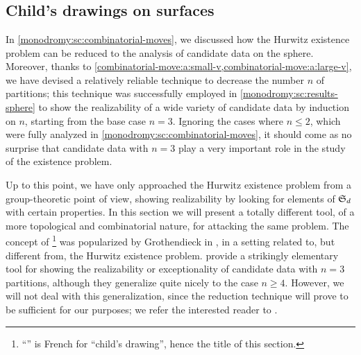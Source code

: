 \chapter{\texorpdfstring{\Dessins{}}{Dessins d'enfant}}

\section{Child's drawings on surfaces}
\smallvertices

In \cref{monodromy:sc:combinatorial-moves}, we discussed how the Hurwitz existence problem can be reduced to the analysis of candidate data on the sphere. Moreover, thanks to \cref{combinatorial-move:a:small-v,combinatorial-move:a:large-v}, we have devised a relatively reliable technique to decrease the number $n$ of partitions; this technique was successfully employed in \cref{monodromy:sc:results-sphere} to show the realizability of a wide variety of candidate data by induction on $n$, starting from the base case $n=3$. Ignoring the cases where $n\le 2$, which were fully analyzed in \cref{monodromy:sc:combinatorial-moves}, it should come as no surprise that candidate data with $n=3$ play a very important role in the study of the existence problem.

Up to this point, we have only approached the Hurwitz existence problem from a group-theoretic point of view, showing realizability by looking for elements of $\symgroup[d]$ with certain properties. In this section we will present a totally different tool, of a more topological and combinatorial nature, for attacking the same problem. The concept of \emph{\dessin{}}\footnote{``\emph{\Dessin{}}'' is French for ``child's drawing'', hence the title of this section.} was popularized by Grothendieck in \cite{grothendieck}, in a setting related to, but different from, the Hurwitz existence problem. \Dessins{} provide a strikingly elementary tool for showing the realizability or exceptionality of candidate data with $n=3$ partitions, although they generalize quite nicely to the case $n\ge 4$. However, we will not deal with this generalization, since the reduction technique will prove to be sufficient for our purposes; we refer the interested reader to .

